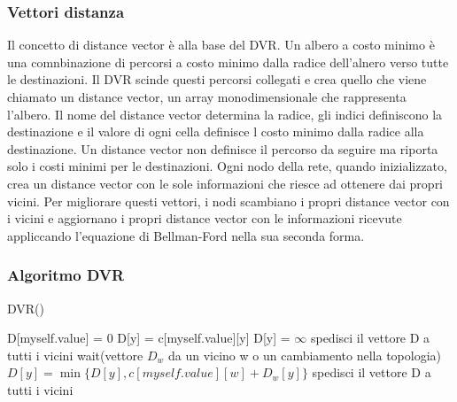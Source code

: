\documentclass[12pt]{report}
\begin{document}
\subsubsection{Vettori distanza}
Il concetto di distance vector è alla base del DVR. Un albero a costo minimo è una comnbinazione di percorsi a costo minimo dalla radice dell'alnero verso tutte le destinazioni. Il DVR scinde questi percorsi collegati e crea quello che viene chiamato un distance vector, un array monodimensionale che rappresenta l'albero. Il nome del distance vector determina la radice, gli indici definiscono la destinazione e il valore di ogni cella definisce l costo minimo dalla radice alla destinazione. Un distance vector non definisce il percorso da seguire  ma riporta solo i costi minimi per le destinazioni. Ogni nodo della rete, quando inizializzato, crea un distance vector con le sole informazioni che riesce ad ottenere dai propri vicini. Per migliorare questi vettori, i nodi scambiano i propri distance vector con i vicini e aggiornano i propri distance vector con le informazioni ricevute appliccando l'equazione di Bellman-Ford nella sua seconda forma.
\subsubsection{Algoritmo DVR}
\begin{algorithm}[h]
	\caption{DVR()}
	\begin{algorithmic}
		\State D[myself.value] = 0
				\State D[y] = c[myself.value][y]
			\Else
				\State D[y] = $\infty$
			\EndIf
		\EndFor
		\State spedisci il vettore D a tutti i vicini
			\State wait(vettore $D_w$ da un vicino w o un cambiamento nella topologia)
				\State $D[y] = \min\{ D[y], c[myself.value][w] + D_w[y] \}$
			\EndFor
				\State spedisci il vettore D a tutti i vicini
			\EndIf
		\EndWhile
	\end{algorithmic}
\end{algorithm}
\end{document}
